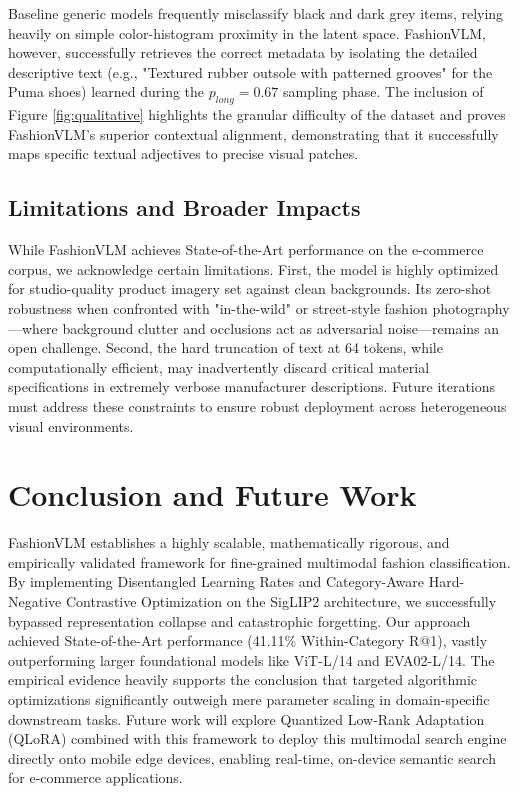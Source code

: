 \documentclass[conference]{IEEEtran}
\begin{document}
Baseline generic models frequently misclassify black and dark grey items, relying heavily on simple color-histogram proximity in the latent space. FashionVLM, however, successfully retrieves the correct metadata by isolating the detailed descriptive text (e.g., "Textured rubber outsole with patterned grooves" for the Puma shoes) learned during the $p_{long} = 0.67$ sampling phase. The inclusion of Figure \ref{fig:qualitative} highlights the granular difficulty of the dataset and proves FashionVLM's superior contextual alignment, demonstrating that it successfully maps specific textual adjectives to precise visual patches.

\subsection{Limitations and Broader Impacts}
While FashionVLM achieves State-of-the-Art performance on the e-commerce corpus, we acknowledge certain limitations. First, the model is highly optimized for studio-quality product imagery set against clean backgrounds. Its zero-shot robustness when confronted with "in-the-wild" or street-style fashion photography---where background clutter and occlusions act as adversarial noise---remains an open challenge. Second, the hard truncation of text at 64 tokens, while computationally efficient, may inadvertently discard critical material specifications in extremely verbose manufacturer descriptions. Future iterations must address these constraints to ensure robust deployment across heterogeneous visual environments.

\section{Conclusion and Future Work}
FashionVLM establishes a highly scalable, mathematically rigorous, and empirically validated framework for fine-grained multimodal fashion classification. By implementing Disentangled Learning Rates and Category-Aware Hard-Negative Contrastive Optimization on the SigLIP2 architecture, we successfully bypassed representation collapse and catastrophic forgetting. Our approach achieved State-of-the-Art performance (41.11\% Within-Category R@1), vastly outperforming larger foundational models like ViT-L/14 and EVA02-L/14. The empirical evidence heavily supports the conclusion that targeted algorithmic optimizations significantly outweigh mere parameter scaling in domain-specific downstream tasks. Future work will explore Quantized Low-Rank Adaptation (QLoRA) combined with this framework to deploy this multimodal search engine directly onto mobile edge devices, enabling real-time, on-device semantic search for e-commerce applications.
\end{document}
